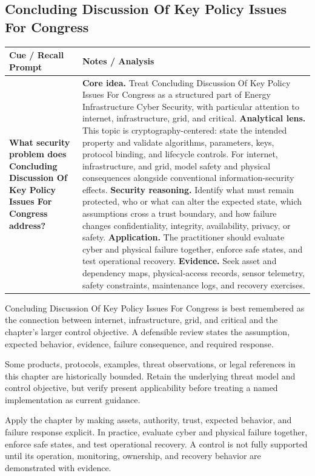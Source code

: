 \documentclass[11pt]{article}
\newcommand{\CornellHeader}{%
\rowcolor{Navy}\color{white}\bfseries Cue / Recall Prompt & \color{white}\bfseries Notes / Analysis\\\hline}
\newcommand{\CornellRow}[2]{%
\cellcolor{CueGray}\RaggedRight\textbf{#1} & \RaggedRight #2\\\hline}
\begin{document}
\subsection*{Concluding Discussion Of Key Policy Issues For Congress}
\begin{longtable}{>{\RaggedRight\arraybackslash}p{}|>{\RaggedRight\arraybackslash}p{}}
\CornellHeader
\CornellRow{What security problem does Concluding Discussion Of Key Policy Issues For Congress address?}{\textbf{Core idea.} Treat Concluding Discussion Of Key Policy Issues For Congress as a structured part of Energy Infrastructure Cyber Security, with particular attention to internet, infrastructure, grid, and critical. \textbf{Analytical lens.} This topic is cryptography-centered: state the intended property and validate algorithms, parameters, keys, protocol binding, and lifecycle controls. For internet, infrastructure, and grid, model safety and physical consequences alongside conventional information-security effects. \textbf{Security reasoning.} Identify what must remain protected, who or what can alter the expected state, which assumptions cross a trust boundary, and how failure changes confidentiality, integrity, availability, privacy, or safety. \textbf{Application.} The practitioner should evaluate cyber and physical failure together, enforce safe states, and test operational recovery. \textbf{Evidence.} Seek asset and dependency maps, physical-access records, sensor telemetry, safety constraints, maintenance logs, and recovery exercises.}
\end{longtable}
\begin{topicsummary}
Concluding Discussion Of Key Policy Issues For Congress is best remembered as the connection between internet, infrastructure, grid, and critical and the chapter's larger control objective. A defensible review states the assumption, expected behavior, evidence, failure consequence, and required response.
\end{topicsummary}
\begin{historybox}
Some products, protocols, examples, threat observations, or legal references in this chapter are historically bounded. Retain the underlying threat model and control objective, but verify present applicability before treating a named implementation as current guidance.
\end{historybox}
\begin{defensebox}
Apply the chapter by making assets, authority, trust, expected behavior, and failure response explicit. In practice, evaluate cyber and physical failure together, enforce safe states, and test operational recovery. A control is not fully supported until its operation, monitoring, ownership, and recovery behavior are demonstrated with evidence.
\end{defensebox}
\end{document}

